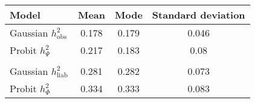  \begin{tabular}{lccc}
 \hline
 Model & Mean & Mode & Standard deviation  \\ 
 \hline 

 Gaussian $h^2_\text{obs}$ & 0.178 & 0.179 & 0.046 \\ 
 Probit $h^2_{\Psi}$ & 0.217 & 0.183 & 0.08 \\ 
  & & & \\ 
 Gaussian $h^2_\text{liab}$ & 0.281 & 0.282 & 0.073 \\ 
 Probit $h^2_{\Phi}$ & 0.334 & 0.333 & 0.083 \\ 
 \bottomrule
\end{tabular}
